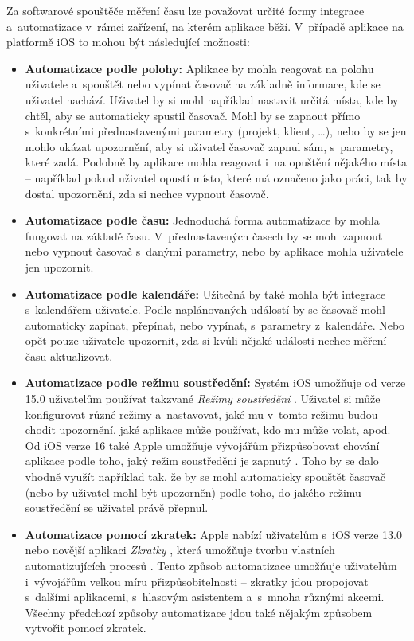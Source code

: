 Za softwarové spouštěče měření času lze považovat určité formy integrace a~automatizace v~rámci zařízení, na kterém aplikace běží. V~případě aplikace na platformě iOS to mohou být následující možnosti:
\begin{itemize}
\item\textbf{Automatizace podle polohy:} Aplikace by mohla reagovat na polohu uživatele a~spouštět nebo vypínat časovač na základně informace, kde se uživatel nachází. Uživatel by si mohl například nastavit určitá místa, kde by chtěl, aby se automaticky spustil časovač. Mohl by se zapnout přímo s~konkrétními přednastavenými parametry (projekt, klient, \dots), nebo by se jen mohlo ukázat upozornění, aby si uživatel časovač zapnul sám, s~parametry, které zadá. Podobně by aplikace mohla reagovat i~na opuštění nějakého místa – například pokud uživatel opustí místo, které má označeno jako práci, tak by dostal upozornění, zda si nechce vypnout časovač.
\item\textbf{Automatizace podle času:} Jednoduchá forma automatizace by mohla fungovat na základě času. V~přednastavených časech by se mohl zapnout nebo vypnout časovač s~danými parametry, nebo by aplikace mohla uživatele jen upozornit.
\item\textbf{Automatizace podle kalendáře:} Užitečná by také mohla být integrace s~kalendářem uživatele. Podle naplánovaných událostí by se časovač mohl automaticky zapínat, přepínat, nebo vypínat, s~parametry z~kalendáře. Nebo opět pouze uživatele upozornit, zda si kvůli nějaké události nechce měření času aktualizovat.
\item\textbf{Automatizace podle režimu soustředění:} Systém iOS umožňuje od verze 15.0 uživatelům používat takzvané \emph{Režimy soustředění} \cite{ios-focus-modes}. Uživatel si může konfigurovat různé režimy a~nastavovat, jaké mu v~tomto režimu budou chodit upozornění, jaké aplikace může používat, kdo mu může volat, apod. Od iOS verze 16 také Apple umožňuje vývojářům přizpůsobovat chování aplikace podle toho, jaký režim soustředění je zapnutý \cite{ios-focus-modes-adjustment}. Toho by se dalo vhodně využít například tak, že by se mohl automaticky spouštět časovač (nebo by uživatel mohl být upozorněn) podle toho, do jakého režimu soustředění se uživatel právě přepnul.
\item\textbf{Automatizace pomocí zkratek:} Apple nabízí uživatelům s~iOS verze 13.0 nebo novější aplikaci \emph{Zkratky} \cite{ios-shortcuts-app}, která umožňuje tvorbu vlastních automatizujících procesů \cite{ios-shortcuts}. Tento způsob automatizace umožňuje uživatelům i~vývojářům velkou míru přizpůsobitelnosti – zkratky jdou propojovat s~dalšími aplikacemi, s~hlasovým asistentem a~s~mnoha různými akcemi. Všechny předchozí způsoby automatizace jdou také nějakým způsobem vytvořit pomocí zkratek. \cite{ios-shortcuts-developer}
\end{itemize}

